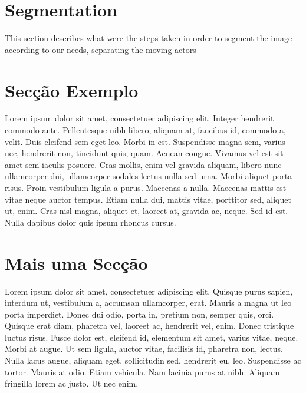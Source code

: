 \section{Segmentation}

This section describes what were the steps taken in order to segment the image according to our needs, separating the moving actors 

\section{Secção Exemplo}


Lorem ipsum dolor sit amet, consectetuer adipiscing elit. Integer
hendrerit commodo ante. Pellentesque nibh libero, aliquam at, faucibus
id, commodo a, velit. 
Duis eleifend sem eget leo. Morbi in est. Suspendisse magna sem,
varius nec, hendrerit non, tincidunt quis, quam. Aenean congue. 
Vivamus vel est sit amet sem iaculis posuere. Cras mollis, enim vel
gravida aliquam, libero nunc ullamcorper dui, ullamcorper sodales
lectus nulla sed urna. Morbi aliquet porta risus. 
Proin vestibulum ligula a purus. Maecenas a nulla. 
Maecenas mattis est vitae neque auctor tempus. Etiam nulla dui,
mattis vitae, porttitor sed, aliquet ut, enim. Cras nisl magna,
aliquet et, laoreet at, gravida ac, neque. Sed id est. Nulla dapibus
dolor quis ipsum rhoncus cursus.

\section{Mais uma Secção}

Lorem ipsum dolor sit amet, consectetuer adipiscing elit. Quisque
purus sapien, interdum ut, vestibulum a, accumsan ullamcorper,
erat. Mauris a magna ut leo porta imperdiet. Donec dui odio, porta in,
pretium non, semper quis, orci. Quisque erat diam, pharetra vel,
laoreet ac, hendrerit vel, enim. Donec tristique luctus risus. Fusce
dolor est, eleifend id, elementum sit amet, varius vitae, neque. Morbi
at augue. Ut sem ligula, auctor vitae, facilisis id, pharetra non,
lectus. Nulla lacus augue, aliquam eget, sollicitudin sed, hendrerit
eu, leo. Suspendisse ac tortor. Mauris at odio. Etiam vehicula. Nam
lacinia purus at nibh. Aliquam fringilla lorem ac justo. Ut nec
enim. 

